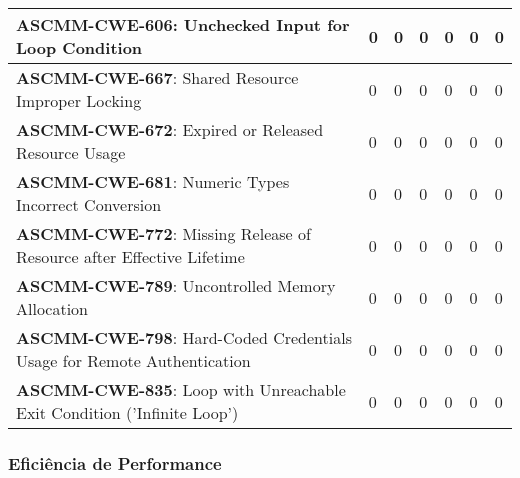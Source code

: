 \documentclass[openany,10pt,a4paper]{article}
\begin{document}
\begin{longtable}{p{3.2in}|p{0.28in}|p{0.28in}|p{0.28in}|p{0.28in}|p{0.28in}|p{0.35in}}
		\textbf{ASCMM-CWE-606}: Unchecked Input for Loop Condition & 0 & 0 & 0 & 0 & 0 & 0 \\ \hline
		\textbf{ASCMM-CWE-667}: Shared Resource Improper Locking & 0 & 0 & 0 & 0 & 0 & 0 \\ \hline
		\textbf{ASCMM-CWE-672}: Expired or Released Resource Usage & 0 & 0 & 0 & 0 & 0 & 0 \\ \hline
		\textbf{ASCMM-CWE-681}: Numeric Types Incorrect Conversion & 0 & 0 & 0 & 0 & 0 & 0 \\ \hline
		\textbf{ASCMM-CWE-772}: Missing Release of Resource after Effective Lifetime & 0 & 0 & 0 & 0 & 0 & 0 \\ \hline
	\textbf{ASCMM-CWE-789}: Uncontrolled Memory Allocation & 0 & 0 & 0 & 0 & 0 & 0 \\ \hline
	\textbf{ASCMM-CWE-798}: Hard-Coded Credentials Usage for Remote Authentication & 0 & 0 & 0 & 0 & 0 & 0 \\ \hline
	\textbf{ASCMM-CWE-835}: Loop with Unreachable Exit Condition ('Infinite Loop') & 0 & 0 & 0 & 0 & 0 & 0 \\ \hline
\end{longtable}

\subsubsection{Eficiência de Performance}
\end{document}
